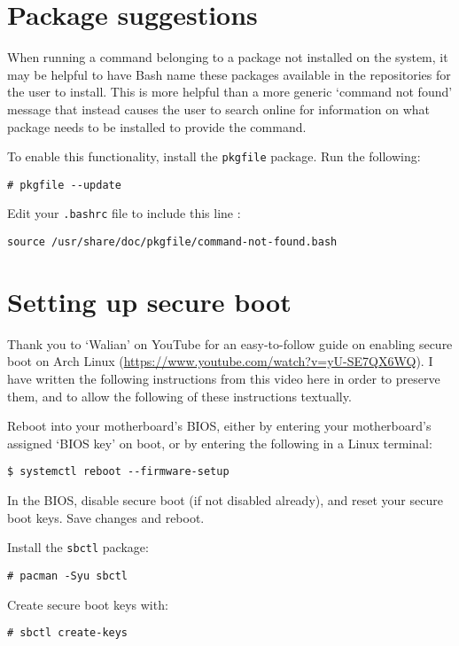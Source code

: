 \documentclass[a4paper]{article}
\begin{document}
\section{Package suggestions}

When running a command belonging to a package not installed on the system, it may be helpful to have Bash name these packages available in the repositories for the user to install.
This is more helpful than a more generic `command not found' message that instead causes the user to search online for information on what package needs to be installed to provide the command.

To enable this functionality, install the \lstinline|pkgfile| package.
Run the following:
\begin{lstlisting}
# pkgfile --update
\end{lstlisting}
Edit your \lstinline|.bashrc| file to include this line \cite{arch-command-not-found}:
\begin{lstlisting}
source /usr/share/doc/pkgfile/command-not-found.bash
\end{lstlisting}


\section{Setting up secure boot}

Thank you to `Walian' on YouTube for an easy-to-follow guide on enabling secure boot on Arch Linux (\url{https://www.youtube.com/watch?v=yU-SE7QX6WQ}).
I have written the following instructions from this video here in order to preserve them, and to allow the following of these instructions textually.

Reboot into your motherboard's BIOS, either by entering your motherboard's assigned `BIOS key' on boot, or by entering the following in a Linux terminal:
\begin{lstlisting}
$ systemctl reboot --firmware-setup
\end{lstlisting}

In the BIOS, disable secure boot (if not disabled already), and reset your secure boot keys.
Save changes and reboot.

Install the \lstinline|sbctl| package:
\begin{lstlisting}
# pacman -Syu sbctl
\end{lstlisting}

Create secure boot keys with:
\begin{lstlisting}
# sbctl create-keys
\end{lstlisting}
\end{document}
